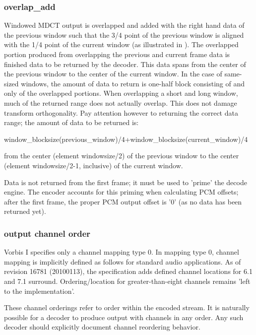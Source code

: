 \subsubsection{overlap\_add}

Windowed MDCT output is overlapped and added with the right hand data
of the previous window such that the 3/4 point of the previous window
is aligned with the 1/4 point of the current window (as illustrated in
).  The overlapped portion
produced from overlapping the previous and current frame data is
finished data to be returned by the decoder.  This data spans from the
center of the previous window to the center of the current window.  In
the case of same-sized windows, the amount of data to return is
one-half block consisting of and only of the overlapped portions. When
overlapping a short and long window, much of the returned range does not
actually overlap.  This does not damage transform orthogonality.  Pay
attention however to returning the correct data range; the amount of
data to be returned is:

\begin{programlisting}
window\_blocksize(previous\_window)/4+window\_blocksize(current\_window)/4
\end{programlisting}

from the center (element windowsize/2) of the previous window to the
center (element windowsize/2-1, inclusive) of the current window.

Data is not returned from the first frame; it must be used to 'prime'
the decode engine.  The encoder accounts for this priming when
calculating PCM offsets; after the first frame, the proper PCM output
offset is '0' (as no data has been returned yet).



\subsubsection{output channel order}

Vorbis I specifies only a channel mapping type 0.  In mapping type 0,
channel mapping is implicitly defined as follows for standard audio
applications. As of revision 16781 (20100113), the specification adds
defined channel locations for 6.1 and 7.1 surround.  Ordering/location
for greater-than-eight channels remains 'left to the implementation'.

These channel orderings refer to order within the encoded stream.  It
is naturally possible for a decoder to produce output with channels in
any order. Any such decoder should explicitly document channel
reordering behavior.

